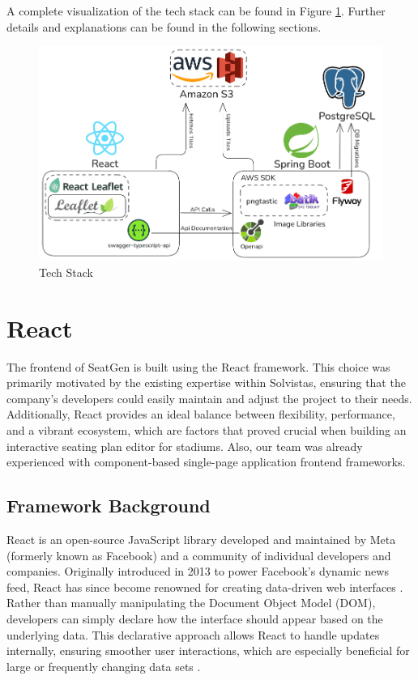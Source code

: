 A complete visualization of the tech stack can be found in Figure \ref{fig:tech-stack}. Further details and explanations can be found in the following sections.

\begin{figure}[H]
    \centering
    \includegraphics[scale=0.4]{pics/tech-stack.png}
    \caption{Tech Stack}
    \label{fig:tech-stack}
\end{figure}


\section{React}
The frontend of SeatGen is built using the React framework. This choice was primarily motivated by the existing expertise within Solvistas, ensuring that the company’s developers could easily maintain and adjust the project to their needs. Additionally, React provides an ideal balance between flexibility, performance, and a vibrant ecosystem, which are factors that proved crucial when building an interactive seating plan editor for stadiums. Also, our team was already experienced with component-based single-page application frontend frameworks.

\subsection{Framework Background}
React is an open-source JavaScript library developed and maintained by Meta (formerly known as Facebook) and a community of individual developers and companies. Originally introduced in 2013 to power Facebook’s dynamic news feed, React has since become renowned for creating data-driven web interfaces \cite{ReactDocs, SPAComp}. Rather than manually manipulating the Document Object Model (DOM), developers can simply declare how the interface should appear based on the underlying data. This declarative approach allows React to handle updates internally, ensuring smoother user interactions, which are especially beneficial for large or frequently changing data sets \cite{ReactVirtualDOM, SPAComp}.

